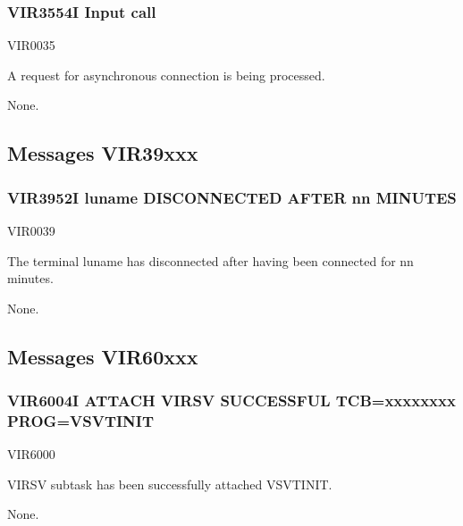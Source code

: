 \documentclass[letterpaper,10pt,english]{sphinxmanual}
\begin{document}
\subsubsection{VIR3554I Input call}
\label{\detokenize{messages:vir3554i-input-call}}\begin{description}
\sphinxAtStartPar
VIR0035

\sphinxAtStartPar
A request for asynchronous connection is being processed.

\sphinxAtStartPar
None.

\end{description}


\subsection{Messages VIR39xxx}
\label{\detokenize{messages:messages-vir39xxx}}

\subsubsection{VIR3952I luname DISCONNECTED AFTER nn MINUTES}
\label{\detokenize{messages:vir3952i-luname-disconnected-after-nn-minutes}}\begin{description}
\sphinxAtStartPar
VIR0039

\sphinxAtStartPar
The terminal luname has disconnected after having been connected for nn minutes.

\sphinxAtStartPar
None.

\end{description}


\subsection{Messages VIR60xxx}
\label{\detokenize{messages:messages-vir60xxx}}

\subsubsection{VIR6004I ATTACH VIRSV SUCCESSFUL TCB=xxxxxxxx PROG=VSVTINIT}
\label{\detokenize{messages:vir6004i-attach-virsv-successful-tcb-xxxxxxxx-prog-vsvtinit}}\begin{description}
\sphinxAtStartPar
VIR6000

\sphinxAtStartPar
VIRSV subtask has been successfully attached VSVTINIT.

\sphinxAtStartPar
None.

\end{description}
\end{document}
